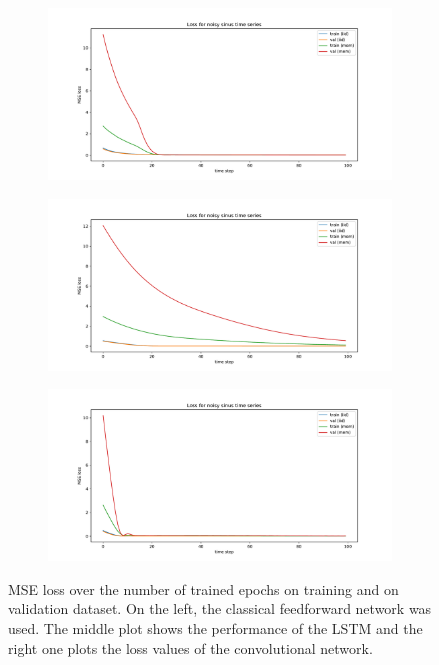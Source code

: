 \documentclass{article}
\begin{document}
\begin{figure}
  \center
  \begin{subfigure}{.35\textwidth}
    \centering
    \includegraphics[width=\linewidth]{figures/plot_twolayer_losscompare.pdf}
  \end{subfigure}
  \hspace{-6mm}
  \begin{subfigure}{.35\textwidth}
    \centering
    \includegraphics[width=\linewidth]{figures/plot_lstm_losscompare.pdf}
  \end{subfigure}
  \hspace{-6mm}
  \begin{subfigure}{.35\textwidth}
    \centering
    \includegraphics[width=\linewidth]{figures/plot_cnn_losscompare.pdf}
  \end{subfigure}
  \caption{MSE loss over the number of trained epochs on training and on
    validation dataset. On the left, the classical feedforward network was used.
    The middle plot shows the performance of the LSTM and the right one plots the
    loss values of the convolutional network.}
  \label{fig:noise_loss_impact}
\end{figure}
\end{document}
